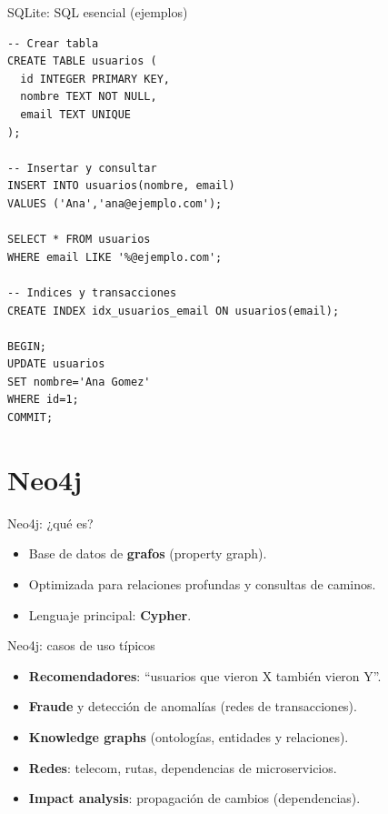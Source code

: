 \documentclass{beamer}
\begin{document}
\begin{frame}[fragile]{SQLite: SQL esencial (ejemplos)}
\begin{verbatim}
-- Crear tabla
CREATE TABLE usuarios (
  id INTEGER PRIMARY KEY,
  nombre TEXT NOT NULL,
  email TEXT UNIQUE
);

-- Insertar y consultar
INSERT INTO usuarios(nombre, email)
VALUES ('Ana','ana@ejemplo.com');

SELECT * FROM usuarios
WHERE email LIKE '%@ejemplo.com';

-- Indices y transacciones
CREATE INDEX idx_usuarios_email ON usuarios(email);

BEGIN;
UPDATE usuarios
SET nombre='Ana Gomez'
WHERE id=1;
COMMIT;
\end{verbatim}
\end{frame}

\section{Neo4j}

\begin{frame}{Neo4j: ¿qué es?}
\begin{itemize}
  \item Base de datos de \textbf{grafos} (property graph).
  \item Optimizada para relaciones profundas y consultas de caminos.
  \item Lenguaje principal: \textbf{Cypher}.
\end{itemize}
\end{frame}

\begin{frame}{Neo4j: casos de uso típicos}
\begin{itemize}
  \item \textbf{Recomendadores}: ``usuarios que vieron X también vieron Y''.
  \item \textbf{Fraude} y detección de anomalías (redes de transacciones).
  \item \textbf{Knowledge graphs} (ontologías, entidades y relaciones).
  \item \textbf{Redes}: telecom, rutas, dependencias de microservicios.
  \item \textbf{Impact analysis}: propagación de cambios (dependencias).
\end{itemize}
\end{frame}
\end{document}
